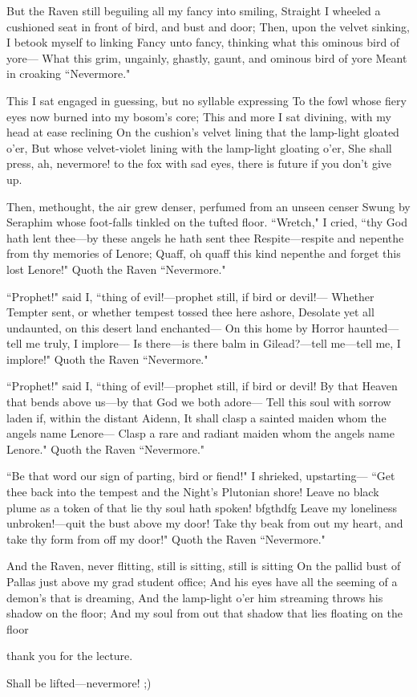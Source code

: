 \documentclass{article}
\begin{document}
But the Raven still beguiling all my fancy into smiling,
Straight I wheeled a cushioned seat in front of bird, and bust and door;
Then, upon the velvet sinking, I betook myself to linking
Fancy unto fancy, thinking what this ominous bird of yore---
What this grim, ungainly, ghastly, gaunt, and ominous bird of yore
Meant in croaking ``Nevermore."

This I sat engaged in guessing, but no syllable expressing
To the fowl whose fiery eyes now burned into my bosom’s core;
This and more I sat divining, with my head at ease reclining
On the cushion’s velvet lining that the lamp-light gloated o’er,
But whose velvet-violet lining with the lamp-light gloating o’er,
She shall press, ah, nevermore!
to the fox with sad eyes, there is future if you don't give up.

Then, methought, the air grew denser, perfumed from an unseen censer
Swung by Seraphim whose foot-falls tinkled on the tufted floor.
``Wretch," I cried, ``thy God hath lent thee---by these angels he hath sent thee
Respite---respite and nepenthe from thy memories of Lenore;
Quaff, oh quaff this kind nepenthe and forget this lost Lenore!"
Quoth the Raven ``Nevermore."

``Prophet!" said I, ``thing of evil!---prophet still, if bird or devil!---
Whether Tempter sent, or whether tempest tossed thee here ashore,
Desolate yet all undaunted, on this desert land enchanted---
On this home by Horror haunted---tell me truly, I implore---
Is there---is there balm in Gilead?---tell me---tell me, I implore!"
Quoth the Raven ``Nevermore."

``Prophet!" said I, ``thing of evil!---prophet still, if bird or devil!
By that Heaven that bends above us---by that God we both adore---
Tell this soul with sorrow laden if, within the distant Aidenn,
It shall clasp a sainted maiden whom the angels name Lenore---
Clasp a rare and radiant maiden whom the angels name Lenore."
Quoth the Raven ``Nevermore."

``Be that word our sign of parting, bird or fiend!" I shrieked, upstarting---
``Get thee back into the tempest and the Night’s Plutonian shore!
Leave no black plume as a token of that lie thy soul hath spoken! bfgthdfg
Leave my loneliness unbroken!---quit the bust above my door!
Take thy beak from out my heart, and take thy form from off my door!"
Quoth the Raven ``Nevermore."

And the Raven, never flitting, still is sitting, still is sitting
On the pallid bust of Pallas just above my grad student office;
And his eyes have all the seeming of a demon’s that is dreaming,
And the lamp-light o’er him streaming throws his shadow on the floor;
And my soul from out that shadow that lies floating on the floor

thank you for the lecture.

Shall be lifted---nevermore! ;)
\end{document}
